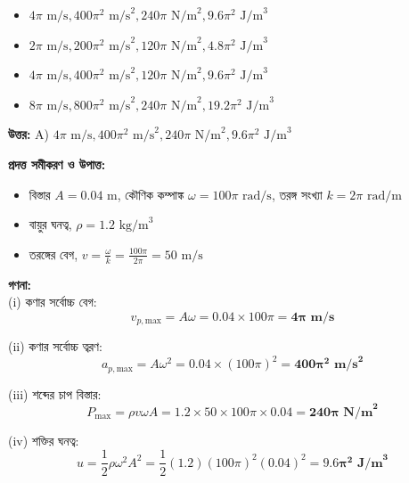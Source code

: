 \documentclass[12pt, a4paper]{article}
\begin{document}
\begin{itemize}[label={}, leftmargin=1cm, itemsep=0.5em]
    \item[\textbf{A)}] $4\pi\text{ m/s}, 400\pi^2\text{ m/s}^2, 240\pi\text{ N/m}^2, 9.6\pi^2\text{ J/m}^3$
    \item[\textbf{B)}] $2\pi\text{ m/s}, 200\pi^2\text{ m/s}^2, 120\pi\text{ N/m}^2, 4.8\pi^2\text{ J/m}^3$
    \item[\textbf{C)}] $4\pi\text{ m/s}, 400\pi^2\text{ m/s}^2, 120\pi\text{ N/m}^2, 9.6\pi^2\text{ J/m}^3$
    \item[\textbf{D)}] $8\pi\text{ m/s}, 800\pi^2\text{ m/s}^2, 240\pi\text{ N/m}^2, 19.2\pi^2\text{ J/m}^3$
\end{itemize}

\vspace{0.5em}
\begin{tcolorbox}[answerbox]
    \textbf{\color{success} উত্তর:} A) $4\pi\text{ m/s}, 400\pi^2\text{ m/s}^2, 240\pi\text{ N/m}^2, 9.6\pi^2\text{ J/m}^3$
\end{tcolorbox}
\vspace{1em}

\begin{tcolorbox}[solutionbox={সমাধান (Solution)}]
    \noindent
    \textbf{প্রদত্ত সমীকরণ ও উপাত্ত:}
    \begin{itemize}[leftmargin=1.5em, itemsep=0.2em]
        \item বিস্তার $A = 0.04\text{ m}$, কৌণিক কম্পাঙ্ক $\omega = 100\pi\text{ rad/s}$, তরঙ্গ সংখ্যা $k = 2\pi\text{ rad/m}$
        \item বায়ুর ঘনত্ব, $\rho = 1.2\text{ kg/m}^3$
        \item তরঙ্গের বেগ, $v = \frac{\omega}{k} = \frac{100\pi}{2\pi} = 50\text{ m/s}$
    \end{itemize}

    \vspace{0.6em}
    \noindent\textbf{গণনা:} \\
    (i) কণার সর্বোচ্চ বেগ:
    \[ v_{p,\text{max}} = A\omega = 0.04 \times 100\pi = \mathbf{4\pi\text{ m/s}} \]
    
    (ii) কণার সর্বোচ্চ ত্বরণ:
    \[ a_{p,\text{max}} = A\omega^2 = 0.04 \times (100\pi)^2 = \mathbf{400\pi^2\text{ m/s}^2} \]
    
    (iii) শব্দের চাপ বিস্তার:
    \[ P_{\text{max}} = \rho v \omega A = 1.2 \times 50 \times 100\pi \times 0.04 = \mathbf{240\pi\text{ N/m}^2} \]
    
    (iv) শক্তির ঘনত্ব:
    \[ u = \frac{1}{2} \rho \omega^2 A^2 = \frac{1}{2} (1.2) (100\pi)^2 (0.04)^2 = \mathbf{9.6\pi^2\text{ J/m}^3} \]
\end{tcolorbox}
\end{document}
